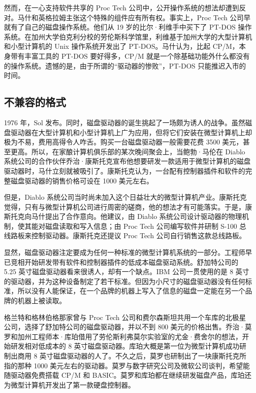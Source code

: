 \documentclass[12pt,UTF8]{ctexbook}
\begin{document}
然而，在一心支持软件共享的 Proc Tech 公司中，公开操作系统的想法却遭到反对。马什和英格拉姆主张这个特殊的组件应有所有权。事实上，Proc Tech 公司早就有了自己的磁盘操作系统。他们从 19 岁的比尔·利维手中买下了 PT-DOS 操作系统。在加州大学伯克利分校的劳伦斯科学馆里，利维基于加州大学的大型计算机和小型计算机的 Unix 操作系统开发出了 PT-DOS。马什认为，比起 CP/M，本身带有丰富工具的 PT-DOS 要好得多，CP/M 就是一个除基础功能外什么都没有的操作系统。遗憾的是，由于所谓的“驱动器的惨败”，PT-DOS 只能推迟入市的时间。





\subsection{不兼容的格式}


1976 年，Sol 发布。同时，磁盘驱动器的诞生挑起了一场颇为诱人的战争。虽然磁盘驱动器在大型计算机和小型计算机上广为应用，但将它们安装在微型计算机上却极为不易，费用高得令人咋舌。购买一台磁盘驱动器一般需要花费 3500 美元，甚至更高。所以，在家酿计算机俱乐部的某次晚间聚会上，当鲍勃·马伦在 Diablo 系统公司的合作伙伴乔治·康斯托克宣布他想要研发一款适用于微型计算机的磁盘驱动器时，马什立刻就被吸引了。康斯托克认为，一台配有控制器插件和软件的完整磁盘驱动器的销售价格可设在 1000 美元左右。

但是，Diablo 系统公司当时尚未加入这个日益壮大的微型计算机产业。康斯托克觉得，只有与微型计算机公司进行周密的磋商，他的想法才有可能落实。于是，康斯托克向马什提出了合作意向。他建议，由 Diablo 系统公司设计驱动器的物理机制，使其能对磁盘读取和写入信息；由 Proc Tech 公司编写软件并研制 S-100 总线路板来控制驱动器。康斯托克还提议 Proc Tech 公司自行销售这款总线路板。

显然，磁盘驱动器注定要成为任何一种标准的微型计算机系统的一部分。工程师早已竞相开始研发带有软件和控制器插件的低成本磁盘驱动系统。舒加特公司的 5.25 英寸磁盘驱动器看来很诱人，却有一个缺点。IBM 公司一贯使用的是 8 英寸的驱动器，并为这种设备制定了若干标准。但因为小尺寸的磁盘驱动器没有任何标准，所以没有人能保证，在一个品牌的机器上写入了信息的磁盘一定能在另一个品牌的机器上被读取。

格兰特和格林伯格那家曾与 Proc Tech 公司和费尔森斯坦共用一个车库的北极星公司，选择了舒加特公司的磁盘驱动器，并以不到 800 美元的价格出售。乔治·莫罗和加州工程师本·库珀借用了劳伦斯利弗莫尔实验室的尤金·费舍尔的想法，开始研发相对低成本的 8 英寸磁盘驱动器。库珀大概是第一位为微型计算机成功研制出商用 8 英寸磁盘驱动器的人了。不久之后，莫罗也研制出了一块康斯托克所指的那种 1000 美元左右的驱动器。莫罗与数字研究公司及微软公司谈判，希望能随驱动器免费搭载 CP/M 和 BASIC。莫罗和库珀都在继续研发磁盘产品，库珀还为微型计算机开发出了第一款硬盘控制器。
\end{document}
